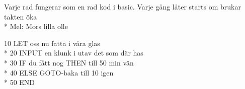 \begin{SongText}
    \begin{SongInfo}
        Varje rad fungerar som en rad kod i basic.
        Varje gång låter starts om brukar takten öka\\*%
        Mel: Mors lilla olle
    \end{SongInfo}
    \begin{SongVerse}
        10 LET oss nu fatta i våra glas\\*%
        20 INPUT en klunk i utav det som där has\\*%
        30 IF du fått nog THEN till 50 min vän\\*%
        40 ELSE GOTO-baka till 10 igen\\*%
        50 END
    \end{SongVerse}
\end{SongText}
